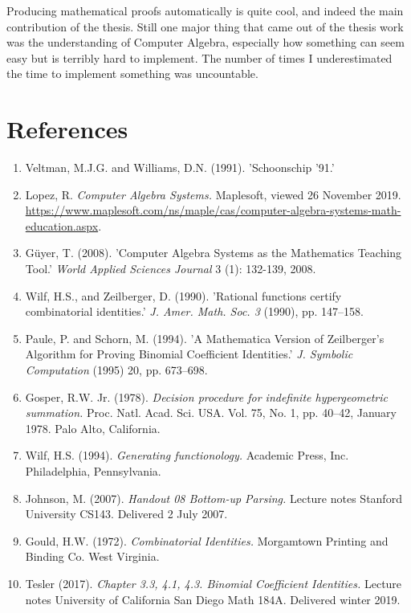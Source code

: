 \documentclass[letterpaper]{article}
\begin{document}
Producing mathematical proofs automatically is quite cool, and indeed the main contribution of the thesis. Still one major thing that came out of the thesis work was the understanding of Computer Algebra, especially how something can seem easy but is terribly hard to implement. The number of times I underestimated the time to implement something was uncountable.

\footnotesize
\section{References}
\begin{enumerate}
  \setlength{\itemsep}{-10.2pt}
  \item Veltman, M.J.G. and Williams, D.N. (1991). 'Schoonschip ’91.'\\
  \item Lopez, R. \textit{Computer Algebra Systems.} Maplesoft, viewed 26 November 2019. \url{https://www.maplesoft.com/ns/maple/cas/computer-algebra-systems-math-education.aspx}.\\
  \item Güyer, T. (2008). 'Computer Algebra Systems as the Mathematics Teaching Tool.' \textit{World Applied Sciences Journal} 3 (1): 132-139, 2008.\\
  \item Wilf, H.S., and Zeilberger, D. (1990). 'Rational functions certify combinatorial identities.' \textit{J. Amer. Math. Soc. 3} (1990), pp. 147–158.\\
  \item Paule, P. and Schorn, M. (1994). 'A Mathematica Version of Zeilberger's Algorithm for Proving Binomial Coefficient Identities.' \textit{J. Symbolic Computation} (1995) 20, pp. 673--698.\\
  \item Gosper, R.W. Jr. (1978). \textit{Decision procedure for indefinite hypergeometric summation.} Proc. Natl. Acad. Sci. USA. Vol. 75, No. 1, pp. 40--42, January 1978. Palo Alto, California.\\
  \item Wilf, H.S. (1994). \textit{Generating functionology.} Academic Press, Inc. Philadelphia, Pennsylvania.\\
  \item Johnson, M. (2007). \textit{Handout 08 Bottom-up Parsing.} Lecture notes Stanford University CS143. Delivered 2 July 2007.\\
  \item Gould, H.W. (1972). \textit{Combinatorial Identities.} Morgamtown Printing and Binding Co. West Virginia.\\
  \item Tesler (2017). \textit{Chapter 3.3, 4.1, 4.3. Binomial Coefficient Identities.} Lecture notes University of California San Diego Math 184A. Delivered winter 2019.\\
\end{enumerate}
\end{document}
